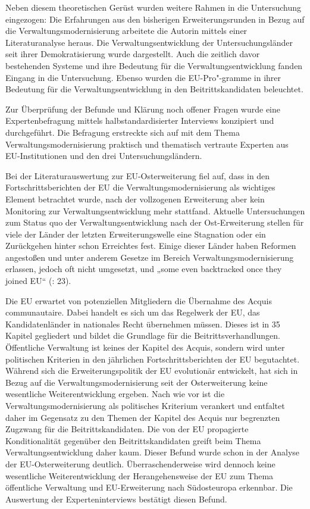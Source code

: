 Neben diesem theoretischen Gerüst wurden weitere Rahmen in die Untersuchung eingezogen: Die Erfahrungen aus den bisherigen Erweiterungsrunden in Bezug auf die Verwaltungsmodernisierung arbeitete die Autorin mittels einer Literaturanalyse heraus. Die Verwaltungsentwicklung der Untersuchungsländer seit ihrer Demokratisierung wurde dargestellt. Auch die zeitlich davor bestehenden Systeme und ihre Bedeutung für die Verwaltungsentwicklung fanden Eingang in die Untersuchung. Ebenso wurden die EU-Pro"-gramme in ihrer Bedeutung für die Verwaltungsentwicklung in den Beitrittskandidaten beleuchtet.\par
Zur Überprüfung der Befunde und Klärung noch offener Fragen wurde eine Expertenbefragung mittels halbstandardisierter Interviews konzipiert und durchgeführt. Die Befragung erstreckte sich auf mit dem Thema Verwaltungsmodernisierung praktisch und thematisch vertraute Experten aus EU-Institutionen und den drei Untersuchungsländern.\par
Bei der Literaturauswertung zur EU-Osterweiterung fiel auf, dass in den Fortschrittsberichten der EU die Verwaltungsmodernisierung als wichtiges Element betrachtet wurde, nach der vollzogenen Erweiterung aber kein Monitoring zur Verwaltungsentwicklung mehr stattfand.
Aktuelle Untersuchungen zum Status quo der Verwaltungsentwicklung nach der Ost-Erweiterung stellen für viele der Länder der letzten Erweiterungswelle eine Stagnation oder ein Zurückgehen hinter schon Erreichtes fest. Einige dieser Länder haben Reformen angestoßen und unter anderem Gesetze im Bereich Verwaltungsmodernisierung erlassen, jedoch oft nicht umgesetzt, und „some even backtracked once they joined EU“ (\cite{pickering}: 23).\par
Die EU erwartet von potenziellen Mitgliedern die Übernahme des Acquis communautaire. Dabei handelt es sich um das Regelwerk der EU, das Kandidatenländer in nationales Recht übernehmen müssen. Dieses ist in 35 Kapitel gegliedert und bildet die Grundlage für die Beitrittsverhandlungen. Öffentliche Verwaltung ist keines der Kapitel des Acquis, sondern wird unter politischen Kriterien in den jährlichen Fortschrittsberichten der EU begutachtet. Während sich die Erweiterungspolitik der EU evolutionär entwickelt, hat sich in Bezug auf die Verwaltungsmodernisierung seit der Osterweiterung keine wesentliche Weiterentwicklung ergeben. Nach wie vor ist die Verwaltungsmodernisierung als politisches Kriterium verankert und entfaltet daher im Gegensatz zu den Themen der Kapitel des Acquis nur begrenzten Zugzwang für die Beitrittskandidaten. Die von der EU propagierte Konditionalität gegenüber den Beitrittskandidaten greift beim Thema Verwaltungsentwicklung daher kaum. Dieser Befund wurde schon in der Analyse der EU-Osterweiterung deutlich. Überraschenderweise wird dennoch keine wesentliche Weiterentwicklung der Herangehensweise der EU zum Thema öffentliche Verwaltung und EU-Erweiterung nach Südosteuropa erkennbar. Die Auswertung der Experteninterviews bestätigt diesen Befund.\par

